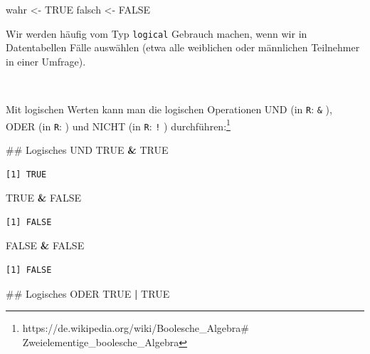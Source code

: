 \documentclass[12pt,]{tufte-book}
\newenvironment{Shaded}{\begin{snugshade}}{\end{snugshade}}
\newcommand{\StringTok}[1]{\textcolor[rgb]{0.31,0.60,0.02}{#1}}
\newcommand{\OtherTok}[1]{\textcolor[rgb]{0.56,0.35,0.01}{#1}}
\newcommand{\OperatorTok}[1]{\textcolor[rgb]{0.81,0.36,0.00}{\textbf{#1}}}
\newcommand{\NormalTok}[1]{#1}
\theoremstyle{definition}
\theoremstyle{definition}
\theoremstyle{definition}
\theoremstyle{remark}
\begin{document}
\begin{Shaded}
\begin{Highlighting}[]
\NormalTok{wahr <-}\StringTok{ }\OtherTok{TRUE}
\NormalTok{falsch <-}\StringTok{ }\OtherTok{FALSE}
\end{Highlighting}
\end{Shaded}

Wir werden häufig vom Typ \texttt{logical} Gebrauch machen, wenn wir in
Datentabellen Fälle auswählen (etwa alle weiblichen oder männlichen
Teilnehmer in einer Umfrage).

~

Mit logischen Werten kann man die logischen Operationen UND (in
\texttt{R}: \texttt{\&} ), ODER (in \texttt{R}: \texttt{\textbar{}} )
und NICHT (in \texttt{R}: \texttt{!} ) durchführen:\footnote{https://de.wikipedia.org/wiki/Boolesche\_Algebra\#
  Zweielementige\_boolesche\_Algebra}

\begin{Shaded}
\begin{Highlighting}[]
\NormalTok{## Logisches UND}
\OtherTok{TRUE} \OperatorTok{&}\StringTok{ }\OtherTok{TRUE}
\end{Highlighting}
\end{Shaded}

\begin{verbatim}
[1] TRUE
\end{verbatim}

\begin{Shaded}
\begin{Highlighting}[]
\OtherTok{TRUE} \OperatorTok{&}\StringTok{ }\OtherTok{FALSE}
\end{Highlighting}
\end{Shaded}

\begin{verbatim}
[1] FALSE
\end{verbatim}

\begin{Shaded}
\begin{Highlighting}[]
\OtherTok{FALSE} \OperatorTok{&}\StringTok{ }\OtherTok{FALSE}
\end{Highlighting}
\end{Shaded}

\begin{verbatim}
[1] FALSE
\end{verbatim}

\begin{Shaded}
\begin{Highlighting}[]
\NormalTok{## Logisches ODER}
\OtherTok{TRUE} \OperatorTok{|}\StringTok{ }\OtherTok{TRUE}
\end{Highlighting}
\end{Shaded}
\end{document}
